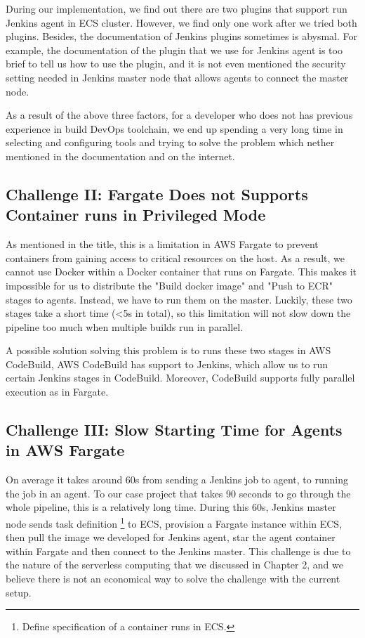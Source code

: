 During our implementation, we find out there are two plugins that support run Jenkins agent in ECS cluster. However, we find only one work after we tried both plugins. Besides, the documentation of Jenkins plugins sometimes is abysmal. For example, the documentation of the plugin that we use for Jenkins agent is too brief to tell us how to use the plugin, and it is not even mentioned the security setting needed in Jenkins master node that allows agents to connect the master node. 
\par
As a result of the above three factors, for a developer who does not has previous experience in build DevOps toolchain, we end up spending a very long time in selecting and configuring tools and trying to solve the problem which nether mentioned in the documentation and on the internet. 
\subsection{Challenge II: Fargate Does not Supports Container runs in Privileged Mode}
As mentioned in the title, this is a limitation in AWS Fargate to prevent containers from gaining access to critical resources on the host. As a result, we cannot use Docker within a Docker container that runs on Fargate. This makes it impossible for us to distribute the "Build docker image" and "Push to ECR" stages to agents. Instead, we have to run them on the master. Luckily, these two stages take a short time (<5s in total), so this limitation will not slow down the pipeline too much when multiple builds run in parallel.
\par
A possible solution solving this problem is to runs these two stages in AWS CodeBuild, AWS CodeBuild has support to Jenkins, which allow us to run certain Jenkins stages in CodeBuild. Moreover, CodeBuild supports fully parallel execution as in Fargate.
\subsection{Challenge III: Slow Starting Time for Agents in AWS Fargate}
On average it takes around 60s from sending a Jenkins job to agent, to running the job in an agent. To our case project that takes 90 seconds to go through the whole pipeline, this is a relatively long time. During this 60s, Jenkins master node sends task definition \footnote{Define specification of a container runs in ECS.} to ECS, provision a Fargate instance within ECS, then pull the image we developed for Jenkins agent, star the agent container within Fargate and then connect to the Jenkins master. This challenge is due to the nature of the serverless computing that we discussed in Chapter 2, and we believe there is not an economical way to solve the challenge with the current setup.

